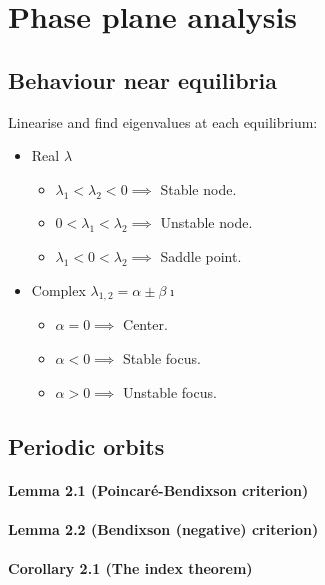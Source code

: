 \section{Phase plane analysis}

\subsection{Behaviour near equilibria}
Linearise and find eigenvalues at each equilibrium:
\begin{itemize}
	\item Real $\lambda$
	\begin{itemize}
		\item $\lambda_1 < \lambda_2 < 0 \implies$ Stable node.
		\item $0 < \lambda_1 < \lambda_2 \implies$ Unstable node.
		\item $\lambda_1 < 0 < \lambda_2 \implies$ Saddle point.
	\end{itemize}
	\item Complex $\lambda_{1,2} = \alpha \pm \beta \imath$
	\begin{itemize}
		\item $\alpha = 0 \implies$ Center.
		\item $\alpha < 0 \implies$ Stable focus.
		\item $\alpha > 0 \implies$ Unstable focus.
	\end{itemize}
\end{itemize}

\subsection{Periodic orbits}

\paragraph{Lemma 2.1 (Poincaré-Bendixson criterion)}

\paragraph{Lemma 2.2 (Bendixson (negative) criterion)}

\paragraph{Corollary 2.1 (The index theorem)}